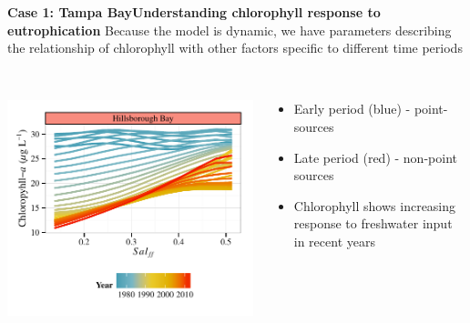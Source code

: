 \documentclass[serif]{beamer}\usepackage[]{graphicx}\usepackage[]{color}
\begin{document}
\begin{frame}{\textbf{Case 1: Tampa Bay}}{\textbf{Understanding chlorophyll response to eutrophication}}
Because the model is dynamic, we have parameters describing the relationship of chlorophyll with other factors specific to different time periods \\~\\
\begin{columns}[T]
\begin{column}{0.45\textwidth}
\centerline{\includegraphics[width = \textwidth]{fig/hill.pdf}}
\end{column}
\begin{column}{0.45\textwidth}
\begin{itemize}
\item Early period (blue) - point-sources
\item Late period (red) - non-point sources
\item Chlorophyll shows increasing response to freshwater input in recent years
\end{itemize}
\end{column}
\end{columns}
\end{frame}
\end{document}
